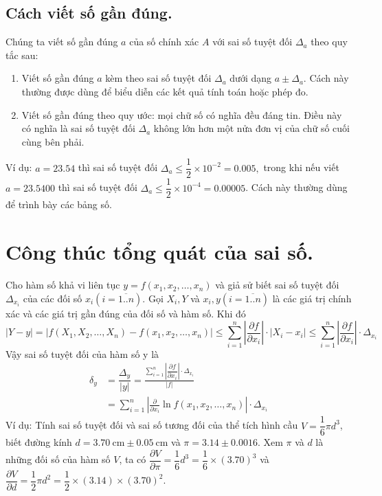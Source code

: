 \documentclass[12pt, a4paper]{report}
\begin{document}
\subsection{Cách viết số gần đúng.}
Chúng ta viết số gần đúng $a$ của số chính xác $A$ với sai số tuyệt đối $\Delta_a$ theo quy tắc sau:
\begin{enumerate}
    \item Viết số gần đúng $a$ kèm theo sai số tuyệt đối $\Delta_a$ dưới dạng $a \pm \Delta_a$. Cách này thường được dùng để biểu diễn các kết quả tính toán hoặc phép đo.
    \item Viết số gần đúng theo quy ước: mọi chữ số có nghĩa đều đáng tin. Điều này có nghĩa là sai số tuyệt đối $\Delta_a$ không lớn hơn một nửa đơn vị của chữ số cuối cùng bên phải.
\end{enumerate}
Ví dụ: $a = 23.54$ thì sai số tuyệt đối $\Delta_a \leq \dfrac{1}{2}\times10^{-2} = 0.005,$ trong khi nếu viết $a = 23.5400$ thì sai số tuyệt đối $\Delta_a \leq \dfrac{1}{2}\times10^{-4} = 0.00005$. Cách này thường dùng để trình bày các bảng số.
\section{Công thúc tổng quát của sai số.}
Cho hàm số khả vi liên tục $y=f\left(x_1, x_2, \ldots, x_n\right)$ và giả sử biết sai số tuyệt đối $\Delta_{x_i}$ của các đối số $x_i(i=\overline{1 . . n})$. Gọi $X_i, Y$ và $x_i, y(i=\overline{1 . . n})$ là các giá trị chính xác và các giá trị gần đúng của đối số và hàm số. Khi đó
\[
|Y-y|=\left|f\left(X_1, X_2, \ldots, X_n\right)-f\left(x_1, x_2, \ldots, x_n\right)\right| \leqslant \sum_{i=1}^n\left|\frac{\partial f}{\partial x_i}\right| \cdot\left|X_i-x_i\right| \leqslant \sum_{i=1}^n\left|\frac{\partial f}{\partial x_i}\right| \cdot \Delta_{x_i}
\]
Vậy sai số tuyệt đối của hàm số y là
\[
\begin{aligned}
 \delta_y &=\dfrac{\Delta_y}{|y|}=\frac{\displaystyle\sum_{i=1}^n\left|\dfrac{\partial f}{\partial x_i}\right| \cdot \Delta_{x_i}}{|f|} \\
&=\sum_{i=1}^n\left|\frac{\partial}{\partial x_i} \ln f\left(x_1, x_2, \ldots, x_n\right)\right| \cdot \Delta_{x_i}
\end{aligned}
\]
Ví dụ: Tính sai số tuyệt đối và sai số tương đối của thể tích hình cầu $V=\dfrac{1}{6} \pi d^3$, biết đường kính $d=3.70 \mathrm{~cm} \pm 0.05 \mathrm{~cm}$ và $\pi=3.14 \pm 0.0016$.
Xem $\pi$ và $d$ là những đối số của hàm số $V$, ta có $\dfrac{\partial V}{\partial \pi}=\dfrac{1}{6} d^3=\dfrac{1}{6} \times(3.70)^3$ và $\dfrac{\partial V}{\partial d}=\dfrac{1}{2} \pi d^2=\dfrac{1}{2} \times(3.14) \times(3.70)^2$.
\end{document}
